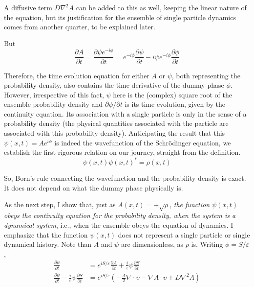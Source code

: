 A diffusive term $D \nabla^2 A$ can be added to this as well, keeping the linear nature of the equation,
but its justification for the ensemble of single particle dynamics comes from another quarter,
to be explained later.

But
\begin{equation*}
\frac{\partial A}{\partial t} = \frac{\partial \psi e^{-i \phi}}{\partial t} = e^{-i \phi} \frac{\partial \psi}{\partial t} -  i \psi e^{-i \phi} \frac{\partial \phi}{\partial t}  \tag{12}
\end{equation*}

Therefore, the time evolution equation for either $A$ or $\psi$, both representing the probability
density, also contains the time derivative of the dummy phase $\phi$. However, irrespective
of this fact, $\psi$ here is the (complex) square root of the ensemble probability density and
$\partial \psi /\partial t$ is its time evolution, given by the continuity equation. Its association with a single
particle is only in the sense of a probability density (the physical quantities associated with
the particle are associated with this probability density). Anticipating the result that this
$\psi (x, t) = Ae^{i \phi}$ is indeed the wavefunction of the Schr\"{o}dinger equation, we establish the first
rigorous relation on our journey, straight from the definition.
\begin{equation*}
\psi (x, t) \psi (x, t)^{\ast} = \rho(x, t) \tag{13}
\end{equation*}

So, Born's rule connecting the wavefunction and the probability density is exact. It does
not depend on what the dummy phase physically is.

As the next step, I show that, just as $A(x, t) = + \sqrt{\rho}$, \textit{the function $\psi (x, t)$ obeys the
continuity equation for the probability density, when the system is a dynamical system}, i.e.,
when the ensemble obeys the equation of dynamics. I emphasize that the function $\psi(x, t)$
does not represent a single particle or single dynamical history. Note than $A$ and $\psi$ are
dimensionless, as $\rho$ is. Writing $\phi = S/\varepsilon$,
\begin{align*}
\frac{\partial \psi}{\partial t} & = e^{i S/\varepsilon} \frac{\partial A}{\partial t} + \frac{i}{\varepsilon} \psi \frac{\partial S}{\partial t} \\
\frac{\partial \psi}{\partial t} - \frac{i}{\varepsilon} \psi \frac{\partial S}{\partial t} & = e^{i S  / \varepsilon} \left(- \frac{A}{2} \nabla \cdot \upsilon - \nabla A \cdot \upsilon + D \nabla^2 A \right) \tag{14}
\end{align*}

